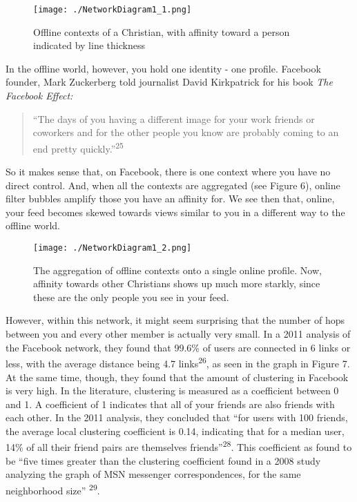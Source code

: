 \documentclass[]{article}
\begin{document}
\begin{figure}
\centering
\texttt{[image: ./NetworkDiagram1\_1.png]}
\caption{Offline contexts of a Christian, with affinity toward a person
indicated by line thickness}
\end{figure}

In the offline world, however, you hold one identity - one profile.
Facebook founder, Mark Zuckerberg told journalist David Kirkpatrick for
his book \emph{The Facebook Effect:}

\begin{quote}
``The days of you having a different image for your work friends or
coworkers and for the other people you know are probably coming to an
end pretty quickly.''\textsuperscript{25}
\end{quote}

So it makes sense that, on Facebook, there is one context where you have
no direct control. And, when all the contexts are aggregated (see Figure
6), online filter bubbles amplify those you have an affinity for. We see
then that, online, your feed becomes skewed towards views similar to you
in a different way to the offline world.

\begin{figure}
\centering
\texttt{[image: ./NetworkDiagram1\_2.png]}
\caption{The aggregation of offline contexts onto a single online
profile. Now, affinity towards other Christians shows up much more
starkly, since these are the only people you see in your feed.}
\end{figure}

However, within this network, it might seem surprising that the number
of hops between you and every other member is actually very small. In a
2011 analysis of the Facebook network, they found that 99.6\% of users
are connected in 6 links or less, with the average distance being 4.7
links\textsuperscript{26}, as seen in the graph in Figure 7. At the same
time, though, they found that the amount of clustering in Facebook is
very high. In the literature, clustering is measured as a coefficient
between 0 and 1. A coefficient of 1 indicates that all of your friends
are also friends with each other. In the 2011 analysis, they concluded
that ``for users with 100 friends, the average local clustering
coefficient is 0.14, indicating that for a median user, 14\% of all
their friend pairs are themselves friends''\textsuperscript{28}. This
coefficient as found to be ``five times greater than the clustering
coefficient found in a 2008 study analyzing the graph of MSN messenger
correspondences, for the same neighborhood size'' \textsuperscript{29}.
\end{document}
